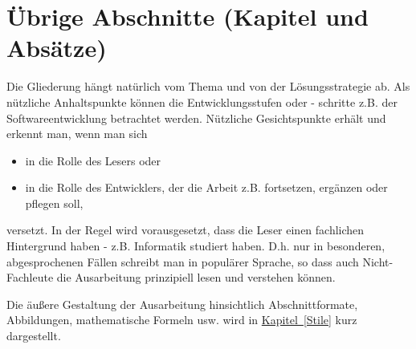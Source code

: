 \chapter{Übrige Abschnitte (Kapitel und Absätze)}
Die Gliederung hängt natürlich vom Thema und von der Lösungsstrategie ab. Als nützliche Anhaltspunkte können die Entwicklungsstufen oder - schritte z.B. der Softwareentwicklung betrachtet werden. Nützliche Gesichtspunkte erhält und erkennt man, wenn man sich
\begin{itemize}
  \item in die Rolle des Lesers oder
  \item in die Rolle des Entwicklers, der die Arbeit z.B. fortsetzen, ergänzen oder pflegen soll,
\end{itemize}
versetzt. In der Regel wird vorausgesetzt, dass die Leser einen fachlichen Hintergrund haben - z.B. Informatik studiert haben. D.h. nur in besonderen, abgesprochenen Fällen schreibt man in populärer Sprache, so dass auch Nicht-Fachleute die Ausarbeitung prinzipiell lesen und verstehen können.

Die äußere Gestaltung der Ausarbeitung hinsichtlich Abschnittformate, Abbildungen, mathematische Formeln usw. wird in \hyperref[Stile]{Kapitel~\ref*{Stile}} kurz dargestellt.